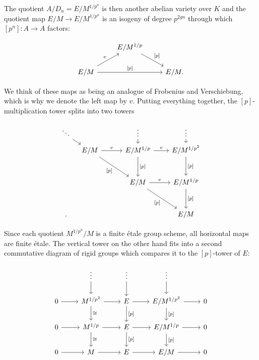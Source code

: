 \documentclass[11pt,oneside]{amsart}
\theoremstyle{definition}
\theoremstyle{remark}
\begin{document}
		The quotient $A/D_n = E/M^{1/p^n}$ is then another abelian variety over $K$ and the quotient map $E/M\rightarrow E/M^{1/p^n}$ is an isogeny of degree $p^{2gn}$  through which  $[p^n]:A\rightarrow A$ factors: 
		\begin{center}
			\begin{equation}\label{factorisation of [p] over E/M}
			\begin{tikzcd}
				& E/M^{1/p} \arrow[rd, "{[p]}"] &  \\
				E/M \arrow[rr, "{[p]}"] \arrow[ru,"v"] &  & E/M.
			\end{tikzcd}
			\end{equation}
		\end{center}
		We think of these maps as being an analogue of Frobenius and Verschiebung, which is why we denote the left map by $v$.
		Putting everything together, the $[p]$-multiplication tower splits into two towers
		\begin{center}
		\begin{equation}\label{p-multiplication tower of E/M splits into vertical and horizontal tower}
		\begin{tikzcd}[column sep={1.2cm,between origins},row sep={0.8cm,between origins}]
			\ddots \arrow[rd] &  &  & \vdots \arrow[d] &  & \vdots \arrow[d] \\
			& E/M \arrow[rr,"v"] \arrow[rrdd, "{[p]}"'] &  & E/M^{1/p} \arrow[rr,"v"] \arrow[dd,"{[p]}"] &  & E/M^{1/p^2} \arrow[dd,"{[p]}"] \\
			&  &  &  &  &  \\
			&  &  & E/M \arrow[rrdd, "{[p]}"'] \arrow[rr,"v"] &  & E/M^{1/p} \arrow[dd,"{[p]}"] \\
			&  &  &  &  &  \\.
			&  &  &  &  & E/M
		\end{tikzcd}
		\end{equation}
		\end{center}
		Since each quotient $M^{1/p^n}/M$ is a finite \'etale group scheme, all horizontal maps are finite \'etale. The vertical tower on the other hand fits into a second commutative diagram of rigid groups which compares it to the $[p]$-tower of $E$:
		
		\begin{center}
		\begin{equation}\label{F-tower for E/M}
		\begin{tikzcd}
			& \vdots \arrow[d] & \vdots \arrow[d] & \vdots \arrow[d] &  \\
			0 \arrow[r] & M^{1/p^2} \arrow[d, "\cong"] \arrow[r] & E \arrow[d, "{[p]}"] \arrow[r] & E/M^{1/p^2} \arrow[d, "{[p]}"] \arrow[r] & 0 \\
			0 \arrow[r] & M^{1/p} \arrow[d, "\cong"] \arrow[r] & E \arrow[d, "{[p]}"] \arrow[r] & E/M^{1/p} \arrow[d, "{[p]}"] \arrow[r] & 0 \\
			0 \arrow[r] & M \arrow[r] & E \arrow[r] & E/M \arrow[r] & 0
		\end{tikzcd}
		\end{equation}
		\end{center}
		
\end{document}
